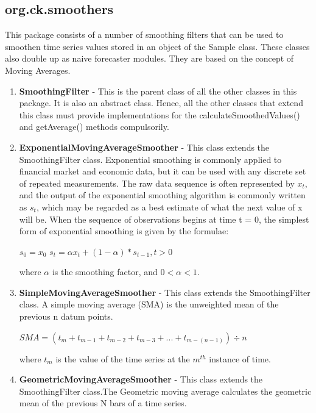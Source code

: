 \documentclass[12pt]{report}
\begin{document}
\subsection{org.ck.smoothers}
This package consists of a number of smoothing filters that can be used to smoothen time series values stored in an object of the Sample class. These classes also double up as naive forecaster modules. They are based on the concept of Moving Averages.

\begin{enumerate}
\item{\textbf{SmoothingFilter} - This is the parent class of all the other classes in this package. It is also an abstract class. Hence, all the other classes that extend this class must provide implementations for the calculateSmoothedValues() and getAverage() methods compulsorily.}

\item{\textbf{ExponentialMovingAverageSmoother} - This class extends the SmoothingFilter class. Exponential smoothing is commonly applied to financial market and economic data, but it can be used with any discrete set of repeated measurements. The raw data sequence is often represented by $x_t$, and the output of the exponential smoothing algorithm is commonly written as $s_t$, which may be regarded as a best estimate of what the next value of x will be. When the sequence of observations begins at time t = 0, the simplest form of exponential smoothing is given by the formulae:

$s_0 = x_0$
$s_t = \alpha x_t + (1 - \alpha) * s_{t-1} , t > 0$

where $\alpha$ is the smoothing factor, and $0 < \alpha < 1$.}

\item{\textbf{SimpleMovingAverageSmoother} - This class extends the SmoothingFilter class. A simple moving average (SMA) is the unweighted mean of the previous n datum points.

$SMA = (t_m + t_{m-1} + t_{m-2} + t_{m-3} + ... + t_{m-(n-1)}) \div n$

where $t_m$ is the value of the time series at the $m^{th}$ instance of time.

}

\item{\textbf{GeometricMovingAverageSmoother} - This class extends the SmoothingFilter class.The Geometric moving average calculates the geometric mean of the previous N bars of a time series.}

\end{enumerate}
\end{document}
